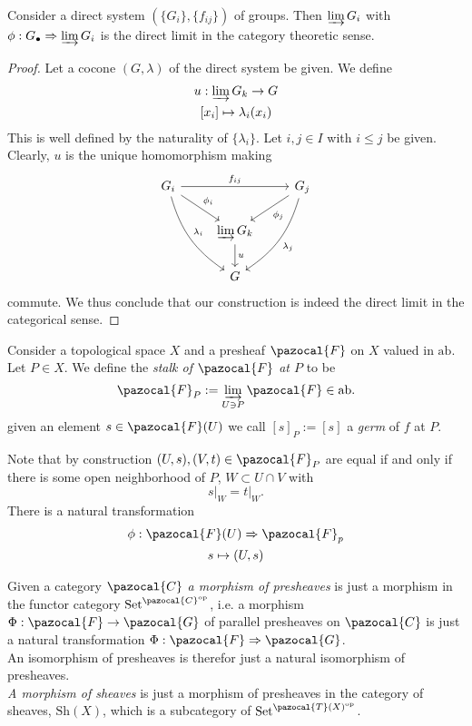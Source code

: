 \begin{lemma}
    Consider a direct system $(\{G_i\},\{f_{ij}\})$ of groups. Then $\varinjlim G_i$ with $\phi: G_\bullet \Rightarrow \varinjlim G_i$ is the direct limit in the category theoretic sense.
\end{lemma}
\begin{proof}
    Let a cocone $(G,\lambda)$ of the direct system be given. We define 
    \begin{gather*}
        u : \varinjlim G_k \rightarrow G\\
        [x_i] \mapsto \lambda_i(x_i)
    \end{gather*}
    This is well defined by the naturality of $\{\lambda_i\}$. Let $i,j\in I$ with $i\leq j$ be given. Clearly, $u$ is the unique homomorphism making 
    $$
        \begin{tikzcd}
            G_i \arrow[rr,"f_{ij}"] \arrow[rd, "\phi_i"]\arrow[rdd, "\lambda_i",bend right = 20] && G_j \arrow[ld,"\phi_j"]\arrow[ldd,"\lambda_j",bend left = 20]\\
            & \varinjlim G_k \arrow[d," u"]\\
            & G
        \end{tikzcd}
    $$    
    commute. We thus conclude that our construction is indeed the direct limit in the categorical sense. 
\end{proof}
\begin{definition}
    Consider a topological space $X$ and a presheaf $\pazocal{F}$ on $X$ valued in $\mathrm{ab}$. Let $P\in X$. We define the \emph{stalk of $\pazocal{F}$ at $P$} to be  
    $$
        \pazocal{F}_P := \varinjlim_{U\ni P} \pazocal{F}\in \mathrm{ab}. 
    $$
    given an element $s\in \pazocal{F}(U)$ we call $[s]_P := [s]$ a \emph{germ} of $f$ at $P$. 
\end{definition}
\begin{remark}
    Note that by construction $(U,s),(V,t)\in \pazocal{F}_P$ are equal if and only if there is some open neighborhood of $P$,  $W\subset U\cap V$ with 
    $$\left. s\right|_{W} = \left. t\right|_W.$$
    There is a natural transformation 
    \begin{gather*}
        \phi : \pazocal{F}(U) \Rightarrow \pazocal{F}_p\\
        s\mapsto (U,s)
    \end{gather*}
\end{remark}
\begin{definition}
    Given a category $\pazocal{C}$ \emph{a morphism of presheaves} is just a morphism in the functor category $\mathrm{Set}^{\pazocal{C}\op}$, i.e. a morphism $\Phi: \pazocal{F} \rightarrow \pazocal{G}$ of parallel presheaves on $\pazocal{C}$ is just a natural transformation $\Phi : \pazocal{F}\Rightarrow \pazocal{G}$.\\
    An isomorphism of presheaves is therefor just a natural isomorphism of presheaves. \\
    \emph{A morphism of sheaves} is just a morphism of presheaves in the category of sheaves, $\mathrm{Sh}(X)$, which is a subcategory of $\mathrm{Set}^{\pazocal{T}(X)\op}$.   
\end{definition}
